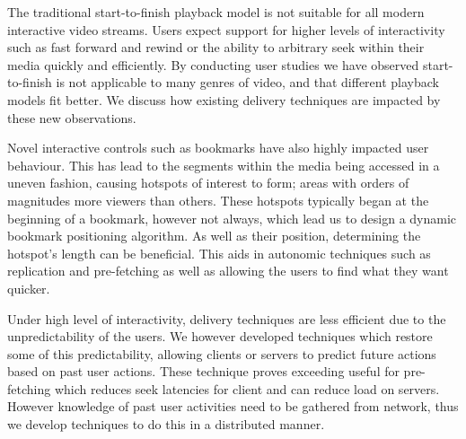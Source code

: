 The traditional start-to-finish playback model is not suitable for all modern interactive video streams. Users expect support for higher levels of interactivity such as fast forward and rewind or the ability to arbitrary seek within their media quickly and efficiently. By conducting user studies we have observed start-to-finish is not applicable to many genres of video, and that different playback models fit better. We discuss how existing delivery techniques are impacted by these new observations.

Novel interactive controls such as bookmarks have also highly impacted user behaviour. This has lead to the segments within the media being accessed in a uneven fashion, causing hotspots of interest to form; areas with orders of magnitudes more viewers than others. These hotspots typically began at the beginning of a bookmark, however not always, which lead us to design a dynamic bookmark positioning algorithm. As well as their position, determining the hotspot's length can be beneficial. This aids in autonomic techniques such as replication and pre-fetching as well as allowing the users to find what they want quicker.

Under high level of interactivity, delivery techniques are less efficient due to the unpredictability of the users. We however developed techniques which restore some of this predictability, allowing clients or servers to predict future actions based on past user actions. These technique proves exceeding useful for pre-fetching which reduces seek latencies for client and can reduce load on servers. However knowledge of past user activities need to be gathered from network, thus we develop techniques to do this in a distributed manner.




